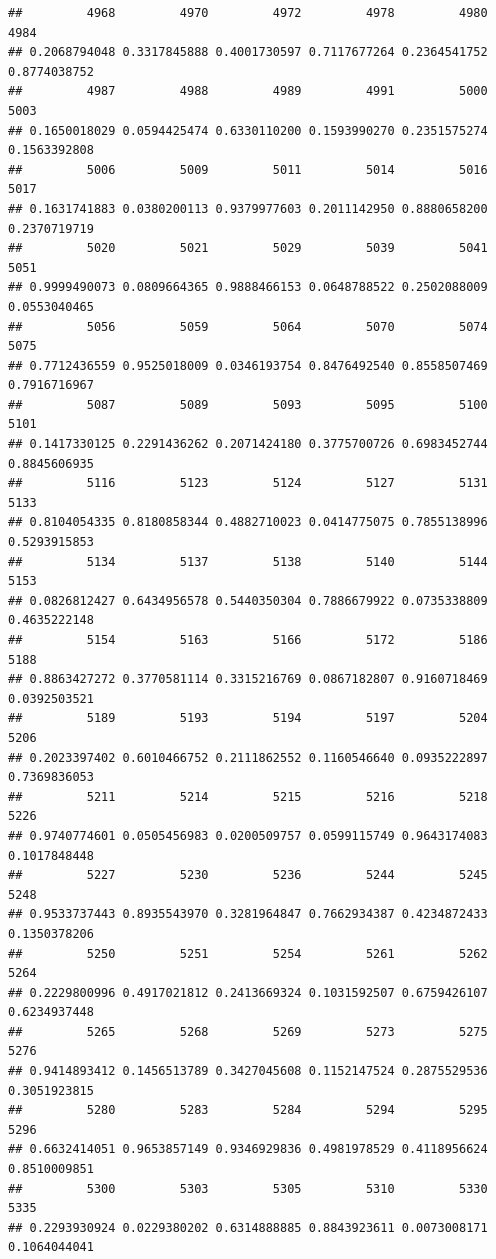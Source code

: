 \documentclass[
]{article}
\begin{document}
\begin{verbatim}
##         4968         4970         4972         4978         4980         4984 
## 0.2068794048 0.3317845888 0.4001730597 0.7117677264 0.2364541752 0.8774038752 
##         4987         4988         4989         4991         5000         5003 
## 0.1650018029 0.0594425474 0.6330110200 0.1593990270 0.2351575274 0.1563392808 
##         5006         5009         5011         5014         5016         5017 
## 0.1631741883 0.0380200113 0.9379977603 0.2011142950 0.8880658200 0.2370719719 
##         5020         5021         5029         5039         5041         5051 
## 0.9999490073 0.0809664365 0.9888466153 0.0648788522 0.2502088009 0.0553040465 
##         5056         5059         5064         5070         5074         5075 
## 0.7712436559 0.9525018009 0.0346193754 0.8476492540 0.8558507469 0.7916716967 
##         5087         5089         5093         5095         5100         5101 
## 0.1417330125 0.2291436262 0.2071424180 0.3775700726 0.6983452744 0.8845606935 
##         5116         5123         5124         5127         5131         5133 
## 0.8104054335 0.8180858344 0.4882710023 0.0414775075 0.7855138996 0.5293915853 
##         5134         5137         5138         5140         5144         5153 
## 0.0826812427 0.6434956578 0.5440350304 0.7886679922 0.0735338809 0.4635222148 
##         5154         5163         5166         5172         5186         5188 
## 0.8863427272 0.3770581114 0.3315216769 0.0867182807 0.9160718469 0.0392503521 
##         5189         5193         5194         5197         5204         5206 
## 0.2023397402 0.6010466752 0.2111862552 0.1160546640 0.0935222897 0.7369836053 
##         5211         5214         5215         5216         5218         5226 
## 0.9740774601 0.0505456983 0.0200509757 0.0599115749 0.9643174083 0.1017848448 
##         5227         5230         5236         5244         5245         5248 
## 0.9533737443 0.8935543970 0.3281964847 0.7662934387 0.4234872433 0.1350378206 
##         5250         5251         5254         5261         5262         5264 
## 0.2229800996 0.4917021812 0.2413669324 0.1031592507 0.6759426107 0.6234937448 
##         5265         5268         5269         5273         5275         5276 
## 0.9414893412 0.1456513789 0.3427045608 0.1152147524 0.2875529536 0.3051923815 
##         5280         5283         5284         5294         5295         5296 
## 0.6632414051 0.9653857149 0.9346929836 0.4981978529 0.4118956624 0.8510009851 
##         5300         5303         5305         5310         5330         5335 
## 0.2293930924 0.0229380202 0.6314888885 0.8843923611 0.0073008171 0.1064044041 

\end{verbatim}
\end{document}
